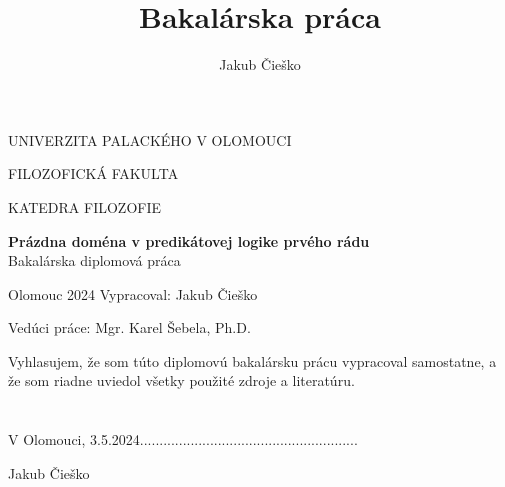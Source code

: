 \documentclass[12pt, letterpaper]{article}
\title{Bakalárska práca}
\author{Jakub Čieško}
\date{}
\begin{document}
	\onehalfspacing  %
	\begin{titlepage}
		    \centering
		    
		  \onehalfspacing 
		  \vspace*{-1.5cm}
		    {UNIVERZITA PALACKÉHO V OLOMOUCI\par
		     FILOZOFICKÁ FAKULTA\par
		    KATEDRA FILOZOFIE} 
		    \vspace{6.5cm} 
    
		    {\Large 
		    \textbf{Prázdna doména v predikátovej logike prvého rádu}\\Bakalárska diplomová práca} %
		    
		    
		    \vfill %
		    \noindent Olomouc 2024 \hfill Vypracoval: Jakub Čieško\par
		    \hfill Vedúci práce: Mgr. Karel Šebela, Ph.D.
	
	\end{titlepage}
	
	
	\clearpage
	
	\setcounter{page}{2}
	\vspace*{\fill}
	\noindent Vyhlasujem, že som túto diplomovú bakalársku prácu vypracoval samostatne, a že som riadne uviedol všetky použité zdroje a literatúru. 
	\\ 
	\\
	\\
	V Olomouci, 3.5.2024\hfill........................................................\par
	\hfill Jakub Čieško \hspace*{1.75cm}
	\vspace*{5cm}
	\clearpage
\end{document}
